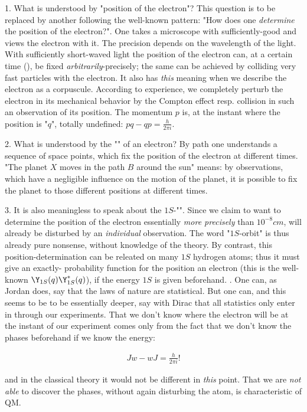 \documentclass{article}
\newcommand{\uequ}[1]{
\begin{align*}
#1
\end{align*}
}
\begin{document}
1. What is understood by "position of the electron"? This question is to be replaced by another following the well-known pattern: "How does one \textit{determine} the position of the electron?". One takes a microscope with sufficiently-good  and views the electron with it. The precision depends on the wavelength of the light. With sufficiently short-waved light the position of the electron can, at a certain time (), be fixed \textit{arbitrarily}-precisely; the same can be achieved by colliding very fast particles with the electron. It also has \textit{this} meaning when we describe the electron as a corpuscule. According to experience, we completely perturb the electron in its mechanical behavior by the Compton effect resp. collision in such an observation of its position. The momentum $p$ is, at the instant where the position is "$q$", totally undefined: $pq-qp=\frac{h}{2\pi i}$.

2. What is understood by the "" of an electron? By path one understands a sequence of space points, which fix the position of the electron at different times. "The planet $X$ moves in the path $B$ around the sun" means: by observations, which have a negligible influence on the motion of the planet, it is possible to fix the planet to those different positions at different times.

3. It is also meaningless to speak about the $1S$-"". Since we claim to want to determine the position of the electron essentially \textit{more precisely} than $10^{-8}cm$,  will already be disturbed by an \textit{individual} observation. The word "$1S$-orbit" is thus already pure nonsense, without knowledge of the theory. By contrast, this position-determination can be releated on many $1S$ hydrogen atoms; thus it must give an exactly- probability function for the position an electron (this is the well-known $\Y_{1S}(q)\Y^*_{1S}(q)$), if the energy $1S$ is given beforehand. . One can, as Jordan does, say that the laws of nature are statistical. But one can, and this seems to be to be essentially deeper, say with Dirac that all statistics only enter in through our experiments. That we don't know where the electron will be at the instant of our experiment comes only from the fact that we don't know the phases beforehand if we know the energy:
\uequ{
Jw-wJ = \frac{h}{2\pi i}!
}
and in the classical theory it would not be different in \textit{this} point. That we are \textit{not able} to discover the phases, without again disturbing the atom, is characteristic of QM.
\end{document}

